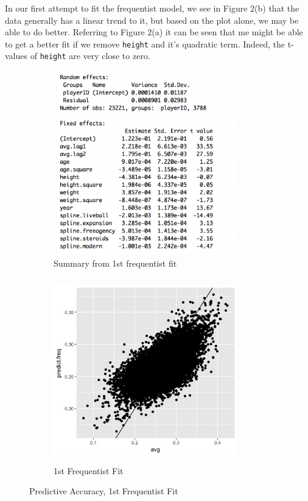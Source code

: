 \documentclass[10pt,a4paper]{article}
\begin{document}
In our first attempt to fit the frequentist model, we see in Figure 2(b) that the data generally has a linear trend to it, but based on the plot alone, we may be able to do better. Referring to Figure 2(a) it can be seen that me might be able to get a better fit if we remove \texttt{height} and it's quadratic term. Indeed, the t-values of \texttt{height} are very close to zero.
\begin{figure}[H]
\begin{subfigure}{0.5\textwidth}
\includegraphics[width=8cm,height=8cm]{../freqsummary}
\caption{Summary from 1st frequentist fit}
\label{fig:subim2}
\end{subfigure}
\begin{subfigure}{0.5\textwidth}
\includegraphics[width=8cm,height=8cm]{../Freqfit_vs_truth.jpeg}
\caption{1st Frequentist Fit}
\label{fig:subim1}
\end{subfigure}

\caption{Predictive Accuracy, 1st Frequentist Fit}
\end{figure}
\end{document}
